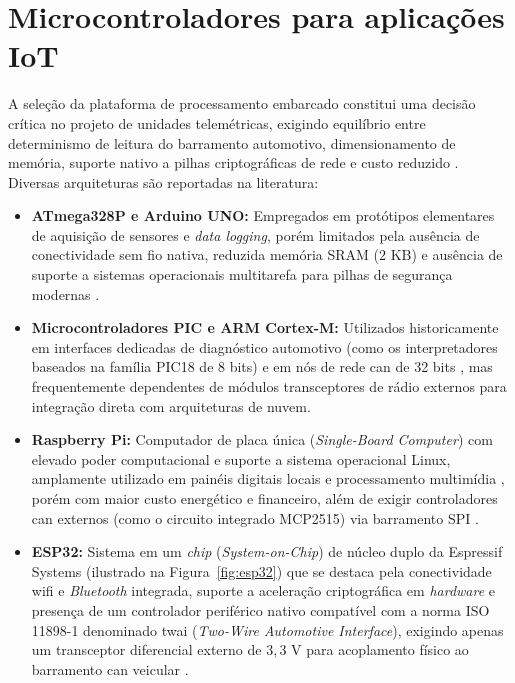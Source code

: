 \documentclass[
	12pt,				%
	openright,			%
	twoside,			%
	a4paper,			%
	english,			%
	brazil				%
	]{abntex2}
\begin{document}
\section{Microcontroladores para aplicações IoT}\label{sec:microcontroladores}

A seleção da plataforma de processamento embarcado constitui uma decisão crítica no
projeto de unidades telemétricas, exigindo equilíbrio entre determinismo de leitura do
barramento automotivo, dimensionamento de memória, suporte nativo a pilhas
criptográficas de rede e custo reduzido \cite{peckol2008,andrijauskas2018}.
Diversas arquiteturas são reportadas na literatura:

\begin{itemize}
    \item \textbf{ATmega328P e Arduino UNO:} Empregados em protótipos elementares de
        aquisição de sensores e \textit{data logging}, porém limitados pela ausência de
        conectividade sem fio nativa, reduzida memória SRAM ($2\text{ KB}$) e ausência
        de suporte a sistemas operacionais multitarefa para pilhas de segurança modernas
        \cite{atmel_atmega328p,andrijauskas2018}.
    \item \textbf{Microcontroladores PIC e ARM Cortex-M:} Utilizados historicamente em
        interfaces dedicadas de diagnóstico automotivo (como os interpretadores baseados
        na família PIC18 de 8 bits) e em nós de rede \acrshort{can} de 32 bits
        \cite{microchip_pic18f4580,st_stm32f103}, mas frequentemente dependentes de
        módulos transceptores de rádio externos para integração direta com arquiteturas
        de nuvem.
    \item \textbf{Raspberry Pi:} Computador de placa única
        (\textit{Single-Board Computer}) com elevado poder computacional e suporte a
        sistema operacional Linux, amplamente utilizado em painéis digitais locais e
        processamento multimídia \cite{raspberrypi_datasheet}, porém com maior custo
        energético e financeiro, além de exigir controladores \acrshort{can} externos
        (como o circuito integrado MCP2515) via barramento SPI
        \cite{microchip_mcp2515}.
    \item \textbf{ESP32:} Sistema em um \textit{chip} (\textit{System-on-Chip}) de
        núcleo duplo da Espressif Systems (ilustrado na Figura~\ref{fig:esp32}) que se
        destaca pela conectividade \acrshort{wifi} e \textit{Bluetooth} integrada,
        suporte a aceleração criptográfica em \textit{hardware} e presença de um
        controlador periférico nativo compatível com a norma ISO 11898-1 denominado
        \acrshort{twai} (\textit{Two-Wire Automotive Interface}), exigindo apenas um
        transceptor diferencial externo de $3{,}3\text{ V}$ para acoplamento físico ao
        barramento \acrshort{can} veicular
        \cite{espressif_esp32_datasheet,ti_sn65hvd230}.
\end{itemize}
\end{document}
